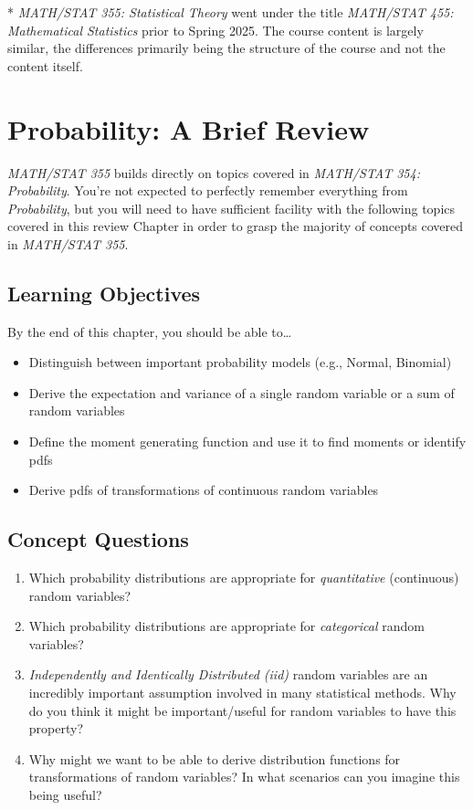 \documentclass[
  letterpaper,
  DIV=11,
  numbers=noendperiod]{scrreprt}
\begin{document}
* \emph{MATH/STAT 355: Statistical Theory} went under the title
\emph{MATH/STAT 455: Mathematical Statistics} prior to Spring 2025. The
course content is largely similar, the differences primarily being the
structure of the course and not the content itself.


\chapter{Probability: A Brief Review}\label{probability-a-brief-review}

\emph{MATH/STAT 355} builds directly on topics covered in
\emph{MATH/STAT 354: Probability}. You're not expected to perfectly
remember everything from \emph{Probability}, but you will need to have
sufficient facility with the following topics covered in this review
Chapter in order to grasp the majority of concepts covered in
\emph{MATH/STAT 355}.

\section{Learning Objectives}\label{learning-objectives}

By the end of this chapter, you should be able to\ldots{}

\begin{itemize}
\item
  Distinguish between important probability models (e.g., Normal,
  Binomial)
\item
  Derive the expectation and variance of a single random variable or a
  sum of random variables
\item
  Define the moment generating function and use it to find moments or
  identify pdfs
\item
  Derive pdfs of transformations of continuous random variables
\end{itemize}

\section{Concept Questions}\label{concept-questions}

\begin{enumerate}
\def\labelenumi{\arabic{enumi}.}
\item
  Which probability distributions are appropriate for
  \emph{quantitative} (continuous) random variables?
\item
  Which probability distributions are appropriate for \emph{categorical}
  random variables?
\item
  \emph{Independently and Identically Distributed (iid)} random
  variables are an incredibly important assumption involved in many
  statistical methods. Why do you think it might be important/useful for
  random variables to have this property?
\item
  Why might we want to be able to derive distribution functions for
  transformations of random variables? In what scenarios can you imagine
  this being useful?
\end{enumerate}
\end{document}
